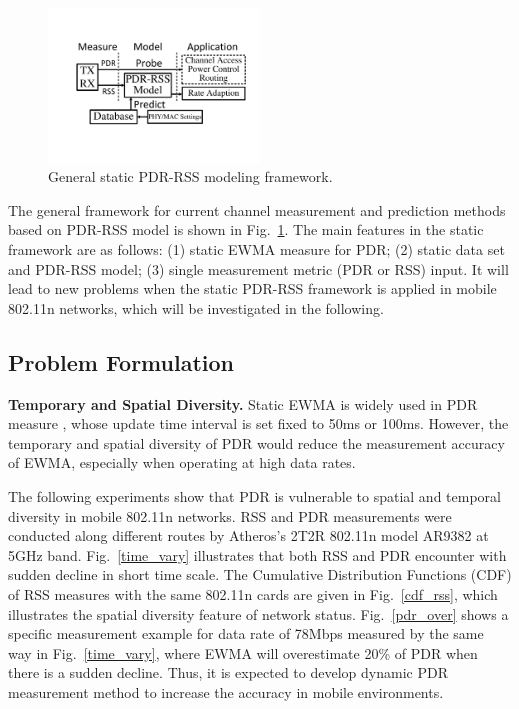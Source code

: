 \documentclass[draftclsnofoot,journal,onecolumn,11pt]{IEEEtran}
\begin{document}
\begin{figure}[!htp]
\centering
\includegraphics[width=0.5\textwidth]{modeling1.pdf}
\caption{General static PDR-RSS modeling framework.}
\label{offlinemodel}
\end{figure}

The general framework for current channel measurement and prediction methods based on PDR-RSS model is shown in Fig.~\ref{offlinemodel}. The main features in the static framework are as follows: (1) static EWMA measure for PDR; (2) static data set and PDR-RSS model; (3) single measurement metric (PDR or RSS) input. It will lead to new problems when the static PDR-RSS framework is applied in mobile 802.11n networks, which will be investigated in the following.

\subsection{Problem Formulation}

\textbf{Temporary and Spatial Diversity.} Static EWMA is widely used in PDR measure \cite{ath9k} \cite{minstrel} \cite{wong2008wireless}, whose update time interval is set fixed to 50ms or 100ms. However, the temporary and spatial diversity of PDR would reduce the measurement accuracy of EWMA, especially when operating at high data rates.

The following experiments show that PDR is vulnerable to spatial and temporal diversity in mobile 802.11n networks. RSS and PDR measurements were conducted along different routes by Atheros's 2T2R 802.11n model AR9382 at 5GHz band. Fig.~\ref{time_vary} illustrates that both RSS and PDR encounter with sudden decline in short time scale. The Cumulative Distribution Functions (CDF) of RSS measures with the same 802.11n cards are given in Fig.~\ref{cdf_rss}, which illustrates the spatial diversity feature of network status. Fig.~\ref{pdr_over} shows a specific measurement example for data rate of 78Mbps measured by the same way in Fig.~\ref{time_vary}, where EWMA will overestimate 20\% of PDR when there is a sudden decline. Thus, it is expected to develop dynamic PDR measurement method to increase the accuracy in mobile environments.
\end{document}
